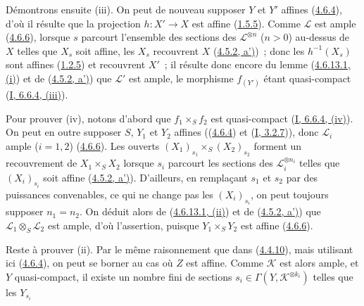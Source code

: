 Démontrons ensuite (iii). On peut de nouveau supposer $Y$ et $Y'$ affines
(\hyperref[II.4.6.4-fr]{4.6.4}), d'où il résulte que la projection
$h:X'\to X$ est affine (\hyperref[II.1.5.5-fr]{1.5.5}). Comme
$\mathcal{L}$ est ample (\hyperref[II.4.6.6-fr]{4.6.6}), lorsque $s$
parcourt l'ensemble des sections des $\mathcal{L}^{\otimes n}$ ($n>0$)
au-dessus de $X$ telles que $X_s$ soit affine, les $X_s$ recouvrent $X$
(\hyperref[II.4.5.2-fr]{4.5.2, a')})~; donc les $h^{-1}(X_s)$ sont affines
(\hyperref[II.1.2.5-fr]{1.2.5}) et recouvrent $X'$~; il résulte donc encore
du lemme (\hyperref[II.4.6.13.1-fr]{4.6.13.1, (i)}) et de
(\hyperref[II.4.5.2-fr]{4.5.2, a')}) que $\mathcal{L}'$ est ample, le
morphisme $f_{(Y')}$ étant quasi-compact
(\hyperref[I.6.6.4-fr]{I, 6.6.4, (iii)}).

Pour prouver (iv), notons d'abord que $f_1\times_S f_2$ est quasi-compact
(\hyperref[I.6.6.4-fr]{I, 6.6.4, (iv)}). On peut en outre supposer $S$,
$Y_1$ et $Y_2$ affines ((\hyperref[II.4.6.4-fr]{4.6.4}) et
(\hyperref[I.3.2.7-fr]{I, 3.2.7})), donc $\mathcal{L}_i$ ample ($i=1,2$)
(\hyperref[II.4.6.6-fr]{4.6.6}). Les ouverts
$(X_1)_{s_1}\times_S(X_2)_{s_2}$ forment un recouvrement de
$X_1\times_S X_2$ lorsque $s_i$ parcourt les sections des
$\mathcal{L}_i^{\otimes n_i}$ telles que $(X_i)_{s_i}$ soit affine
(\hyperref[II.4.5.2-fr]{4.5.2, a')}). D'ailleurs, en remplaçant $s_1$ et
$s_2$ par des puissances convenables, ce qui ne change pas les
$(X_i)_{s_i}$, on peut toujours supposer $n_1=n_2$. On déduit alors de
(\hyperref[II.4.6.13.1-fr]{4.6.13.1, (ii)}) et de
(\hyperref[II.4.5.2-fr]{4.5.2, a')}) que
$\mathcal{L}_1\otimes_S\mathcal{L}_2$ est ample, d'où l'assertion, puisque
$Y_1\times_S Y_2$ est affine (\hyperref[II.4.6.6-fr]{4.6.6}).

Reste à prouver (ii). Par le même raisonnement que dans
(\hyperref[II.4.4.10-fr]{4.4.10}), mais utilisant ici
(\hyperref[II.4.6.4-fr]{4.6.4}), on peut se borner au cas où $Z$ est
affine. Comme $\mathcal{K}$ est alors ample, et $Y$ quasi-compact, il existe
un nombre fini de sections $s_i\in\Gamma(Y,\mathcal{K}^{\otimes k_i})$
telles que les $Y_{s_i}$



